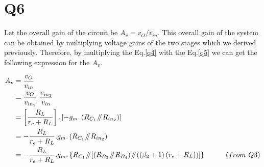 \documentclass[a4paper,11pt]{article}%
\newcommand{\parallelsum}{\mathbin{\!/\mkern-5mu/\!}}
\begin{document}
\section*{Q6}

Let the overall gain of the circuit be $A_v = v_O/v_{in}$. This overall gain of the system can be obtained by multiplying voltage gains of the two stages which we derived previously. Therefore, by multiplying the Eq.\eqref{q4} with the Eq.\eqref{q5} we can get the following expression for the $A_v$.

\[
\begin{split}
A_v &= \frac{v_O}{v_{in}}\\
&= 	\frac{v_O}{v_{in_2}}.\frac{v_{in_2}}{v_{in}}\\
&= \left[\frac{R_L}{r_e+R_L}\right].\left[-g_m.\left( R_{C_1} \parallelsum R_{in_2} \right)\right]\\
&= -\frac{R_L}{r_e+R_L}.g_m.\left( R_{C_1} \parallelsum R_{in_2} \right)\\
&= -\frac{R_L}{r_e+R_L}.g_m. \left\{ R_{C_1} \parallelsum \left[ \left( R_{B_3} \parallelsum R_{B_4}\right) \parallelsum \left(\left(\beta_2+1\right)\left(r_e+R_L\right)\right) \right] \right\} \hspace{1cm} (from~Q3) 
\end{split}
\]
\end{document}
